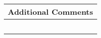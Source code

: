 \documentclass[letterpaper, 10pt]{article} %
\begin{document}
\begin{tabular}{l}

\begin{minipage}{6in} \hspace*{-.25in} {\bf Additional Comments} \vspace*{.25in} \end{minipage} \\ \hline

\begin{minipage}{6in} \vspace*{.25in} \end{minipage} \\ \hline

\begin{minipage}{6in} \vspace*{.25in} \end{minipage} \\ \hline

\begin{minipage}{6in} \vspace*{.25in} \end{minipage} \\ \hline

\begin{minipage}{6in} \vspace*{.25in} \end{minipage} \\ \hline

\begin{minipage}{6in} \vspace*{.25in} \end{minipage} \\ \hline






\end{tabular}
\end{document}
